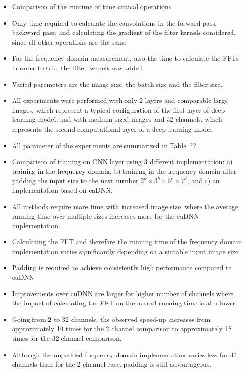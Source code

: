 \begin{itemize}
\item Comparison of the runtime of time critical operations
\item Only time required to calculate the convolutions in the forward pass,
backward pass, and calculating the gradient of the filter kernels considered,
since all other operations are the same
\item For the frequency domain measurement, also the time to calculate the FFTs
in order to trim the filter kernels was added.
\item Varied parameters are the image size, the batch size and the filter size.
\item All experiments were performed with only 2 layers and comparable large
images, which represent a typical configuration of the first layer of deep
learning model, and with medium sized images and 32 channels, which represents
the second computational layer of a deep learning model.
\item All parameter of the experiments are summarized in Table~??.
\end{itemize}

\begin{itemize}
\item Comparison of training on CNN layer using 3 different implementation: a)
training in the frequency domain, b) training in the frequency domain after
padding the input size to the next number $2^a\times3^b\times5^c\times7^d$, and
c) an implementation based on cuDNN.
\item All methods require more time with increased image size, where the average
running time over multiple sizes increases more for the cuDNN implementation.
\item Calculating the FFT and therefore the running time of the frequency domain
implementation varies significantly depending on a suitable input image size
\item Padding is required to achieve consistently high performance compared to
cuDNN
\item Improvements over cuDNN are larger for higher number of channels where the
impact of calculating the FFT on the overall running time is also lower
\item Going from 2 to 32 channels, the observed speed-up increases from
approximately 10 times for the 2 channel comparison to approximately 18 times
for the 32 channel comparison.
\item Although the unpadded frequency domain implementation varies less for 32
channels than for the 2 channel case, padding is still advantageous.
\end{itemize}


